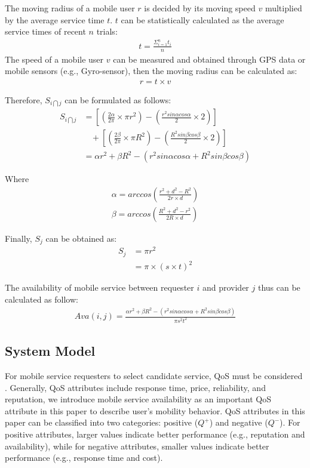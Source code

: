 \documentclass[10pt,journal,compsoc]{IEEEtran}
\begin{document}
The moving radius of a mobile user $r$ is decided by its moving speed $v$ multiplied by the average service time $t$. $t$ can be statistically calculated as the average service times of recent $n$ trials:
\begin{align}
t = \frac{\Sigma_{i=1}^{n}t_i}{n}
\end{align}
The speed of a mobile user $v$ can be measured and obtained through GPS data or mobile sensors (e.g., Gyro-sensor), then the moving radius can be calculated as:
\begin{align}
r = t \times v
\end{align}

Therefore, $S_{i \bigcap j}$ can be formulated as follows:
\setlength{\arraycolsep}{0.0em}
\begin{align}
S_{i \bigcap j} & =  [(\frac{2\alpha}{2\pi} \times \pi r^2)-(\frac{r^2 sin\alpha cos\alpha}{2} \times 2)]\\\nonumber
& \ \ \ \ +[(\frac{2\beta}{2\pi} \times \pi R^2)-(\frac{R^2 sin\beta cos\beta}{2} \times 2)]\\\nonumber
& = \alpha r^2 + \beta R^2 - (r^2 sin\alpha cos\alpha + R^2 sin\beta cos\beta)
\end{align}
\setlength{\arraycolsep}{5pt}

Where
\begin{eqnarray}
\alpha = arccos(\frac{r^2+d^2-R^2}{2r\times d}) \\\nonumber
\beta = arccos(\frac{R^2+d^2-r^2}{2R\times d})
\end{eqnarray}

Finally, $S_j$ can be obtained as:
\begin{align}
S_j & = \pi r^2 \\\nonumber
& = \pi \times (s \times t)^2
\end{align}

The availability of mobile service between requester $i$ and provider $j$ thus can be calculated as follow:
\begin{align}
Ava(i,j) = \frac{\alpha r^2 + \beta R^2 - (r^2 sin\alpha cos\alpha + R^2 sin\beta cos\beta)}{\pi s^2 t^2}
\end{align}

\subsection{System Model}
For mobile service requesters to select candidate service, QoS must be considered \cite{Wu2016,luo2014efficient,luo2016generating}. Generally, QoS attributes include response time, price, reliability, and reputation, we introduce mobile service availability as an important QoS attribute in this paper to describe user's mobility behavior. QoS attributes in this paper can be classified into two categories: positive ($Q^+$) and negative ($Q^{-}$). For positive attributes, larger values indicate better performance (e.g., reputation and availability), while for negative attributes, smaller values indicate better performance (e.g., response time and cost).
\end{document}
